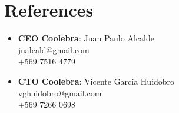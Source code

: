 \documentclass[letterpaper,11pt]{article}
\begin{document}
\section{References}
\begin{itemize}[leftmargin=0.15in, label={}]
  \item{
      \textbf{CEO Coolebra}{: Juan Paulo Alcalde} \\
      jualcald@gmail.com \\
      +569 7516 4779 \\
  }
  
  \item{
      \textbf{CTO Coolebra}{: Vicente García Huidobro} \\
      vghuidobro@gmail.com \\
      +569 7266 0698 \\
  }
  
\end{itemize}
\end{document}
